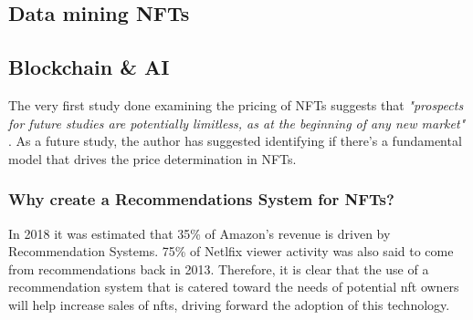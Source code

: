 

\subsection{Data mining NFTs}







\subsection{Blockchain \& AI}


The very first study done examining the pricing of NFTs suggests that \emph{"prospects for future studies are potentially limitless, as at the beginning of any new market"} \autocite{dowling_fertile_2021}. As a future study, the author has suggested identifying if there's a fundamental model that drives the price determination in NFTs.

\subsubsection{Why create a Recommendations System for NFTs?}
In 2018 it was estimated that 35\% of Amazon's revenue \cite{naumov_deep_2019} is driven by Recommendation Systems. 75\% of Netlfix viewer activity \cite{vanderbilt_science_nodate} was also said to come from recommendations back in 2013. Therefore, it is clear that the use of a recommendation system that is catered toward the needs of potential \gls{nft} owners will help increase sales of \gls{nft}s, driving forward the adoption of this technology.


